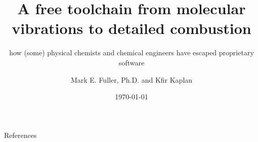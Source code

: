 \documentclass[10pt,presentation]{beamer}
\title[Chemistry free software toolchain]{A free toolchain from molecular vibrations to detailed combustion}
\subtitle{how (some) physical chemists and chemical engineers have escaped proprietary software}
\author[Fuller \& Kaplan]{Mark E. Fuller, Ph.D. and Kfir Kaplan}
\institute{LibrePlanet 2022}
\date[20 March 2022]{\today}
\begin{document}


\begin{frame}{References}
\printbibliography 
\end{frame}
\end{document}
